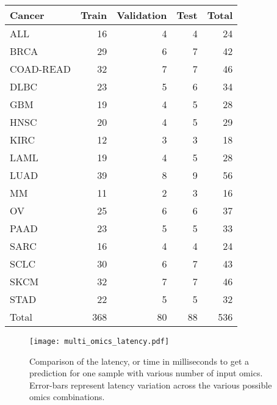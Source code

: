 \begin{table}[htbp]
\begin{subtable}[t]{0.45\textwidth}
         \subcaption{}
         \begin{tabular}{lrrrr}
             \toprule
             Cancer    & Train & Validation & Test & Total \\
             \midrule
             ALL       & 16    & 4          & 4    & 24    \\
             BRCA      & 29    & 6          & 7    & 42    \\
             COAD-READ & 32    & 7          & 7    & 46    \\
             DLBC      & 23    & 5          & 6    & 34    \\
             GBM       & 19    & 4          & 5    & 28    \\
             HNSC      & 20    & 4          & 5    & 29    \\
             KIRC      & 12    & 3          & 3    & 18    \\
             LAML      & 19    & 4          & 5    & 28    \\
             LUAD      & 39    & 8          & 9    & 56    \\
             MM        & 11    & 2          & 3    & 16    \\
             OV        & 25    & 6          & 6    & 37    \\
             PAAD      & 23    & 5          & 5    & 33    \\
             SARC      & 16    & 4          & 4    & 24    \\
             SCLC      & 30    & 6          & 7    & 43    \\
             SKCM      & 32    & 7          & 7    & 46    \\
             STAD      & 22    & 5          & 5    & 32    \\
             \midrule
             Total     & 368   & 80         & 88   & 536   \\
             \bottomrule
         \end{tabular}\label{tab:ccle}
     \end{subtable}
 \end{table}

 \begin{figure}
     \centering
     \texttt{[image: multi\_omics\_latency.pdf]}
     \caption{Comparison of the latency, or time in milliseconds to get a prediction for one sample with various number of input omics. Error-bars represent latency variation across the various possible omics combinations.}\label{fig:latency}
 \end{figure}

